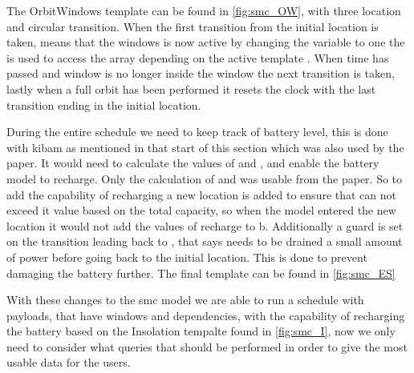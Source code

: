 The OrbitWindows template can be found in \cref{fig:smc_OW}, with three location and circular transition. When the first transition from the initial location is taken, means that the windows is now active by changing the variable  to one the  is used to access the array depending on the active template . When time has passed and window is no longer inside the window the next transition is taken, lastly when a full orbit has been performed it resets the clock  with the last transition ending in the initial location.

During the entire schedule we need to keep track of battery level, this is done with \gls{kibam} as mentioned in that start of this section which was also used by the paper. It would need to calculate the values of  and , and enable the battery model to recharge. Only the calculation of  and  was usable from the paper. So to add the capability of recharging a new location is added to ensure that  can not exceed it value based on the total capacity, so when the model entered the new location it would not add the values of recharge to b. Additionally a guard is set on the transition leading back to , that says  needs to be drained a small amount of power before going back to the initial location. This is done to prevent damaging the battery further. The final template can be found in \cref{fig:smc_ES}

With these changes to the \gls{smc} model we are able to run a schedule with payloads, that have windows and dependencies, with the capability of recharging the battery based on the Insolation tempalte found in \cref{fig:smc_I}, now we only need to consider what queries that should be performed in order to give the most usable data for the users.




